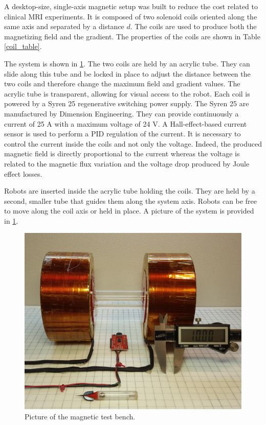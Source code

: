 \documentclass[letterpaper, 10 pt, conference]{ieeeconf}  %
\begin{document}
A desktop-size, single-axis magnetic setup was built to reduce the cost related to clinical MRI experiments.
 It is composed of two solenoid coils oriented along the same axis and separated by a distance $d$. 
 The coils are used to produce both the magnetizing field and the gradient. 
 The properties of the coils are shown in Table \ref{coil_table}.\par
The system is shown in \cref{magnetic_setup}.
 The two coils are held by an acrylic tube. 
 They can slide along this tube and be locked in place to adjust the distance between the two coils and therefore change the maximum field and gradient values. 
 The acrylic tube is transparent, allowing for visual access to the robot.
Each coil is powered by a Syren 25 regenerative switching power supply. The Syren 25 are manufactured by Dimension Engineering. They can provide continuously a current of 25 A with a maximum voltage of 24 V.
A Hall-effect-based current sensor is used to perform a PID regulation of the current. 
It is necessary to control the current inside the coils and not only the voltage. 
Indeed, the produced magnetic field is directly proportional to the current whereas the voltage is related to the magnetic flux variation and the voltage drop produced by Joule effect losses.\par
Robots are inserted inside the acrylic tube holding the coils. 
They are held by a second, smaller tube that guides them along the system axis. 
Robots can be free to move along the coil axis or held in place. 
A picture of the system is provided in \cref{magnetic_setup}.

\begin{figure}
  \includegraphics[width=\linewidth]{Magnetic_test_bench.jpg}
  \caption{Picture of the magnetic test bench.}
  \label{magnetic_setup}
\end{figure}
\end{document}
